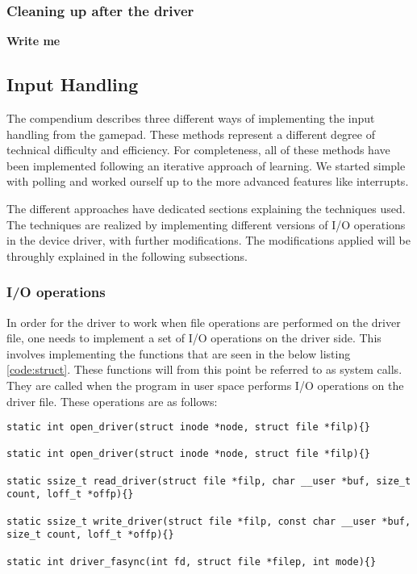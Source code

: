 \subsubsection{Cleaning up after the driver}
{\bf Write me}





\subsection{Input Handling}
The compendium describes three different ways of implementing the input handling from the gamepad. These methods represent a different degree of technical difficulty and efficiency. For completeness, all of these methods have been implemented following an iterative approach of learning. We started simple with polling and worked ourself up to the more advanced features like interrupts.

The different approaches have dedicated sections explaining the techniques used. The techniques are realized by implementing different versions of I/O operations in the device driver, with further modifications. The modifications applied will be throughly explained in the following subsections. 


\subsubsection{I/O operations}
In order for the driver to work when file operations are performed on the driver file, one needs to implement a set of I/O operations on the driver side. This involves implementing the functions that are seen in the below listing \ref{code:struct}. These functions will from this point be referred to as system calls. They are called when the program in user space performs I/O operations on the driver file. These operations are as follows: 

\begin{lstlisting}[caption=System calls, label=code:func]
static int open_driver(struct inode *node, struct file *filp){}

static int open_driver(struct inode *node, struct file *filp){}

static ssize_t read_driver(struct file *filp, char __user *buf, size_t count, loff_t *offp){}

static ssize_t write_driver(struct file *filp, const char __user *buf, size_t count, loff_t *offp){}

static int driver_fasync(int fd, struct file *filep, int mode){}
\end{lstlisting}




